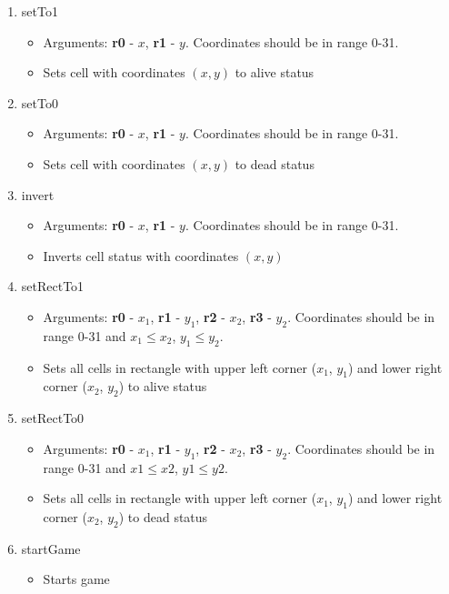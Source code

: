 \begin{enumerate}
	\item setTo1
		\begin{itemize}
			\item Arguments: \textbf{r0} - $x$, \textbf{r1} - $y$. Coordinates should be in range 0-31.
			\item Sets cell with coordinates $(x, y)$ to alive status
		\end{itemize}
	\item setTo0
		\begin{itemize}
			\item Arguments: \textbf{r0} - $x$, \textbf{r1} - $y$. Coordinates should be in range 0-31.
			\item Sets cell with coordinates $(x, y)$ to dead status
		\end{itemize}
	\item invert
		\begin{itemize}
			\item Arguments: \textbf{r0} - $x$, \textbf{r1} - $y$. Coordinates should be in range 0-31.
			\item Inverts cell status with coordinates $(x, y)$
		\end{itemize}
	\item setRectTo1
		\begin{itemize}
			\item Arguments: \textbf{r0} - $x_{1}$, \textbf{r1} - $y_{1}$, \textbf{r2} - $x_{2}$, \textbf{r3} - $y_{2}$. Coordinates should be in range 0-31 and $x_{1} \leq x_{2}$, $y_{1} \leq y_{2}$.
			\item Sets all cells in rectangle with upper left corner ($x_{1}$, $y_{1}$) and lower right corner ($x_{2}$, $y_{2}$) to alive status
		\end{itemize}
	\item setRectTo0
		\begin{itemize}
			\item Arguments: \textbf{r0} - $x_{1}$, \textbf{r1} - $y_{1}$, \textbf{r2} - $x_{2}$, \textbf{r3} - $y_{2}$. Coordinates should be in range 0-31 and $x1 \leq x2$, $y1 \leq y2$.
			\item Sets all cells in rectangle with upper left corner ($x_{1}$, $y_{1}$) and lower right corner ($x_{2}$, $y_{2}$) to dead status
		\end{itemize}
	\item startGame
		\begin{itemize}
			\item Starts game
		\end{itemize}

\end{enumerate}
